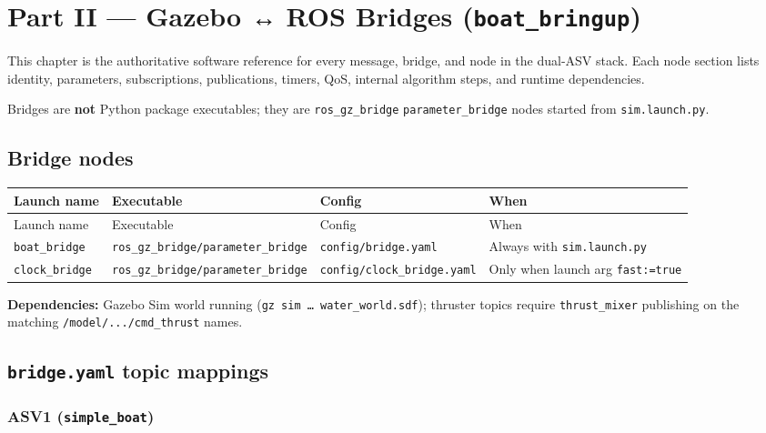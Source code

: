 \chapter{Part II --- Gazebo ↔ ROS Bridges (\texttt{boat\_bringup})}
\label{ch:ros-catalog}

This chapter is the authoritative software reference for every message, bridge, and node in the dual-ASV stack. Each node section lists identity, parameters, subscriptions, publications, timers, QoS, internal algorithm steps, and runtime dependencies.


Bridges are \textbf{not} Python package executables; they are \texttt{ros\_gz\_bridge} \texttt{parameter\_bridge} nodes started from \texttt{sim.launch.py}.


\section{Bridge nodes}


\begin{center}
\small
\begin{longtable}{@{}lllp{5.2cm}@{}}
\toprule
Launch name & Executable & Config & When \\
\midrule
\endfirsthead
\toprule
Launch name & Executable & Config & When \\
\midrule
\endhead
\texttt{boat\_bridge} & \texttt{ros\_gz\_bridge/parameter\_bridge} & \texttt{config/bridge.yaml} & Always with \texttt{sim.launch.py} \\
\texttt{clock\_bridge} & \texttt{ros\_gz\_bridge/parameter\_bridge} & \texttt{config/clock\_bridge.yaml} & Only when launch arg \texttt{fast:=true} \\
\bottomrule
\end{longtable}
\end{center}


\textbf{Dependencies:} Gazebo Sim world running (\texttt{gz sim … water\_world.sdf}); thruster topics require \texttt{thrust\_mixer} publishing on the matching \texttt{/model/.../cmd\_thrust} names.


\section{\texttt{bridge.yaml} topic mappings}


\subsection{ASV1 (\texttt{simple\_boat})}


